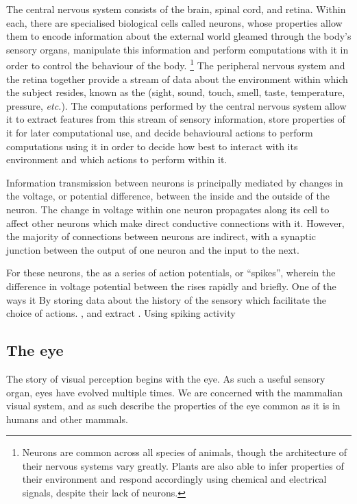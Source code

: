 The central nervous system consists of the brain, spinal cord, and retina.
Within each, there are specialised biological cells called neurons, whose properties allow them to encode information about the external world gleamed through the body's sensory organs, manipulate this information and perform computations with it in order to control the behaviour of the body.%
\footnote{
Neurons are common across all species of animals, though the architecture of their nervous systems vary greatly.
Plants are also able to infer properties of their environment and respond accordingly using chemical and electrical signals, despite their lack of neurons.
}
The peripheral nervous system and the retina together provide a stream of data about the environment within which the subject resides, known as the  (sight, sound, touch, smell, taste, temperature, pressure, \textit{etc.}).
The computations performed by the central nervous system allow it to extract features from this stream of sensory information, store properties of it for later computational use, and decide behavioural actions to perform   computations using it in order to decide how best to interact with its environment and which actions to perform within it.\citep{TEDWolpert}

Information transmission between neurons is principally mediated by changes in the voltage, or potential difference, between the inside and the outside of the neuron.
The change in voltage within one neuron propagates along its cell to affect other neurons which make direct conductive connections with it.
However, the majority of connections between neurons are indirect, with a synaptic junction between the output of one neuron and the input to the next.

For these neurons, the
as a series of action potentials, or ``spikes'', wherein the difference in voltage potential between the  rises rapidly and briefly.
One of the ways it 
By storing data about the history of the sensory which facilitate the choice of actions.
, and extract . 
Using spiking activity 


\subsection{The eye}

The story of visual perception begins with the eye.
As such a useful sensory organ, eyes have evolved multiple times.
We are concerned with the mammalian visual system, and as such describe the properties of the eye common as it is in humans and other mammals.



